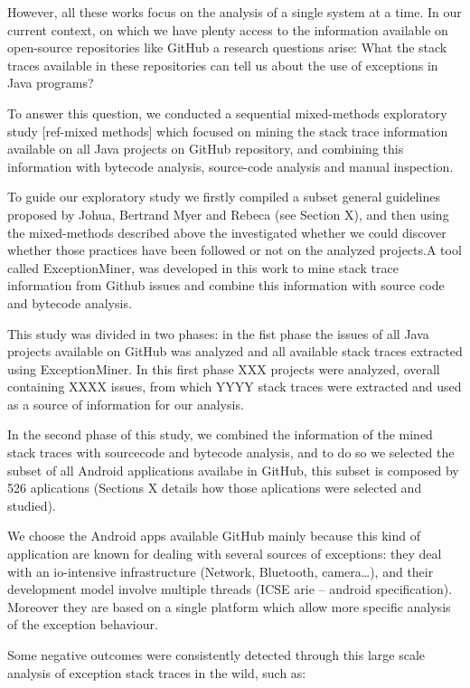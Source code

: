 \documentclass[conference]{IEEEtran}
\begin{document}
However, all these works focus on the analysis of a single system at a time. In our current context, on which we have plenty access to the information available on open-source repositories like GitHub a research questions arise: What the stack traces available in these repositories can tell us about the use of exceptions in Java programs?

To answer this question, we conducted a sequential mixed-methods exploratory study [ref-mixed methods] which focused on mining the stack trace information available on all Java projects on GitHub repository, and combining this information with bytecode analysis, source-code analysis and manual inspection. 

To guide our exploratory study we firstly compiled a subset general guidelines proposed by Johua, Bertrand Myer and Rebeca (see Section X), and then using the mixed-methods described above the investigated whether we could discover whether those practices have been followed or not on the analyzed projects.A tool called ExceptionMiner, was developed in this work to mine stack trace information from Github issues and combine this information with source code and bytecode analysis.

This study was divided in two phases: in the fist phase the issues of all Java projects available on GitHub was analyzed and all available stack traces extracted using ExceptionMiner. In this first phase XXX projects were analyzed, overall containing XXXX issues, from which YYYY stack traces were extracted and used as a source of information for our analysis.

In the second phase of this study, we combined the information of the mined stack traces with sourcecode and bytecode analysis, and to do so we selected the subset of all Android applications availabe in GitHub, this subset is composed by 526 aplications (Sections X details how those aplications were selected and studied). 

We choose the Android apps available GitHub mainly because this kind of application are known for dealing with several sources of exceptions: they deal with an io-intensive infrastructure (Network, Bluetooth, camera…), and their development model involve multiple threads (ICSE arie – android specification). Moreover they are based on a single platform which allow more specific analysis of the exception behaviour.

Some negative outcomes were consistently detected through this large scale analysis of exception stack traces in the wild, such as:
\end{document}
